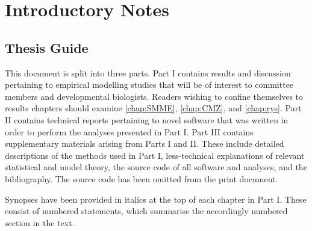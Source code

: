 \documentclass{ut-thesis}
\begin{document}
\begin{NoHyper}
\begin{preliminary}

\end{preliminary}



\section*{Introductory Notes}
\label{ch:intro}

\subsection*{Thesis Guide}
This document is split into three parts. Part I contains results and discussion pertaining to empirical modelling studies that will be of interest to committee members and developmental biologists. Readers wishing to confine themselves to results chapters should examine \autoref{chap:SMME}, \autoref{chap:CMZ}, and \autoref{chap:rys}. Part II contains technical reports pertaining to novel software that was written in order to perform the analyses presented in Part I. Part III contains supplementary materials arising from Parts I and II. These include detailed descriptions of the methods used in Part I, less-technical explanations of relevant statistical and model theory, the source code of all software and analyses, and the bibliography. The source code has been omitted from the print document.

Synopses have been provided in italics at the top of each chapter in Part I. These consist of numbered statements, which summarise the accordingly numbered section in the text.


\end{NoHyper}
\end{document}
